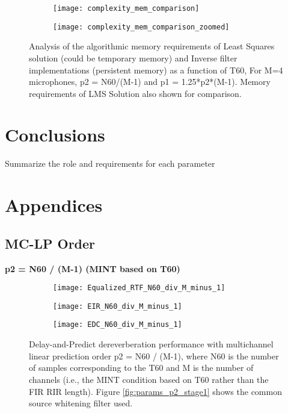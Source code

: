 \begin{figure}[H]
	\centering
	\begin{subfigure}[b]{0.45\textwidth}
		\centering
		\texttt{[image: complexity\_mem\_comparison]}
	\end{subfigure}
	\hfill
	\begin{subfigure}[b]{0.45\textwidth}
		\centering
		\texttt{[image: complexity\_mem\_comparison\_zoomed]}
	\end{subfigure}
	\caption{Analysis of the algorithmic memory requirements  of Least Squares solution (could be temporary memory) and Inverse filter implementations (persistent memory) as a function of T60, For M=4 microphones, p2 = N60/(M-1) and p1 = 1.25*p2*(M-1). Memory requirements of LMS Solution also shown for comparison.}
	\label{fig:complexity_memory}
\end{figure}



\section{Conclusions}

Summarize the role and requirements for each parameter



\section{Appendices}

\subsection{MC-LP Order}

\textbf{p2 = N60 / (M-1)  (MINT based on T60)}

\begin{figure}[H]
	\centering
	\begin{subfigure}[b]{0.32\textwidth}
		\centering
		\texttt{[image: Equalized\_RTF\_N60\_div\_M\_minus\_1]}
	\end{subfigure}
	\hfill
	\begin{subfigure}[b]{0.32\textwidth}
		\centering
		\texttt{[image: EIR\_N60\_div\_M\_minus\_1]}
	\end{subfigure}
	\hfill
	\begin{subfigure}[b]{0.32\textwidth}
		\centering
		\texttt{[image: EDC\_N60\_div\_M\_minus\_1]}
	\end{subfigure}
	\hfill
	\caption{Delay-and-Predict dereverberation performance with multichannel linear prediction order p2 = N60 / (M-1), where N60 is the number of samples corresponding to the T60 and M is the number of channels (i.e., the MINT condition based on T60 rather than the FIR RIR length). Figure \ref{fig:params_p2_stage1} shows the common source whitening filter used.}
	\label{fig:params_p2_N60}
\end{figure}

